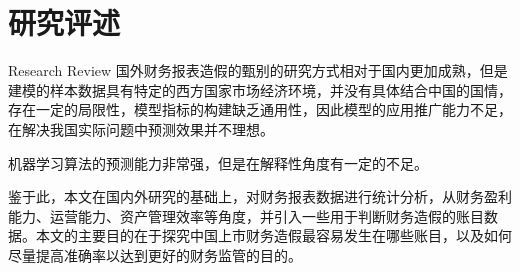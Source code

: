 \section{研究评述}{Research Review}
国外财务报表造假的甄别的研究方式相对于国内更加成熟，但是建模的样本数据具有特定的西方国家市场经济环境，并没有具体结合中国的国情，存在一定的局限性，模型指标的构建缺乏通用性，因此模型的应用推广能力不足，在解决我国实际问题中预测效果并不理想。

机器学习算法的预测能力非常强，但是在解释性角度有一定的不足。

鉴于此，本文在国内外研究的基础上，对财务报表数据进行统计分析，从财务盈利能力、运营能力、资产管理效率等角度，并引入一些用于判断财务造假的账目数据。本文的主要目的在于探究中国上市财务造假最容易发生在哪些账目，以及如何尽量提高准确率以达到更好的财务监管的目的。